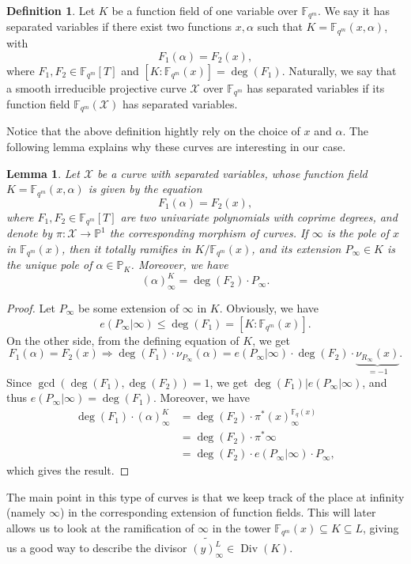 \documentclass[10pt]{article}
\newtheorem{lem1}[thm]{Lemma}
\theoremstyle{definition}
\theoremstyle{definition}
\theoremstyle{definition}
\newtheorem{def1}[thm]{Definition}
\newcommand{\cd}{\cdot}
\newcommand{\PP}{\mathbb{P}}
\newcommand{\fqm}{\mathbb{F}_{q^m}}
\newcommand{\fq}{\mathbb{F}_q}
\newcommand{\su}{\subseteq}
\newcommand{\X}{\mathcal{X}}
\newcommand{\Div}{\operatorname{Div}}
\begin{document}
\begin{def1} \label{courbes a variables separees}
Let $K$ be a function field of one variable over $\fqm$. We say it has separated variables if there exist two functions $x,\alpha$ such that $K=\fqm(x,\alpha)$, with
\[F_1(\alpha) = F_2(x),\]
where $F_1,F_2 \in \fqm[T]$ and $[K:\fqm(x)] = \deg({F_1})$.
Naturally, we say that a smooth irreducible projective curve $\X$ over $\fqm$ has separated variables if its function field $\fqm(\X)$ has separated variables.
\end{def1}

Notice that the above definition hightly rely on the choice of $x$ and $\alpha$. The following lemma explains why these curves are interesting in our case.

\begin{lem1} \label{lemdegre}
Let $\X$ be a curve with separated variables, whose function field $K=\fqm(x,\alpha)$ is given by the equation
\[F_1(\alpha) = F_2(x),\]
where $F_1,F_2 \in \fqm[T]$ are two univariate polynomials with coprime degrees, and denote by $\pi : \X \longrightarrow \PP^1$  the corresponding morphism of curves. If $\infty$ is the pole of $x$ in $\fqm(x)$, then it totally ramifies in $K/\fqm(x)$, and its extension $P_{\infty} \in K$ is the unique pole of $\alpha \in \PP_K$. Moreover, we have 
\[(\alpha)^K_{\infty} = \deg{(F_2) \cd P_{\infty}}.\]
\end{lem1}

\begin{proof}
Let $P_{\infty}$ be some extension of $\infty$ in $K$. Obviously, we have
\[e(P_{\infty}|\infty) \leq \deg(F_1)=[K:\fqm(x)].\]
On the other side, from the defining equation of $K$, we get
\[F_1(\alpha) = F_2(x) \Rightarrow \deg(F_1) \cd \nu_{P_{\infty}}(\alpha) = e(P_{\infty}|\infty) \cd \deg(F_2) \cd \underbrace{\nu_{R_{\infty}}(x)}_{=-1}.\]
Since $\gcd(\deg(F_1),\deg( F_2))=1$, we get $\deg(F_1)|e(P_{\infty}|\infty)$, and thus $e(P_{\infty}|\infty)=\deg(F_1)$. Moreover, we have 
\begin{align*}
\deg(F_1) \cd (\alpha)^K_{\infty} &= \deg(F_2) \cd \pi^*(x)^{\fq(x)}_{\infty} \\
&= \deg(F_2) \cd \pi^*\infty \\
&= \deg(F_2) \cd e(P_{\infty}|\infty) \cd P_{\infty},
\end{align*}
which gives the result.
\end{proof}

The main point in this type of curves is that we keep track of the place at infinity (namely $\infty$) in the corresponding extension of function fields. This will later allows us to look at the ramification of $\infty$ in the tower $\fqm(x) \su K \su L$, giving us a good way to describe the divisor $\widetilde{(y)_{\infty}^L} \in \Div(K)$.
\end{document}
